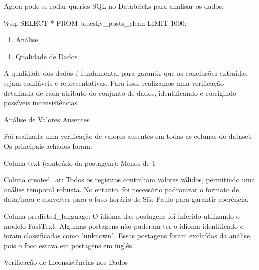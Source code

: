 \documentclass[
  letterpaper,
  DIV=11,
  numbers=noendperiod]{scrartcl}
\newenvironment{Shaded}{\begin{snugshade}}{\end{snugshade}}
\newcommand{\DecValTok}[1]{\textcolor[rgb]{0.68,0.00,0.00}{#1}}
\newcommand{\NormalTok}[1]{\textcolor[rgb]{0.00,0.23,0.31}{#1}}
\newcommand{\OperatorTok}[1]{\textcolor[rgb]{0.37,0.37,0.37}{#1}}
\providecommand{\tightlist}{%
  \setlength{\itemsep}{0pt}\setlength{\parskip}{0pt}}\usepackage{longtable,booktabs,array}
\begin{document}
Agora pode-se rodar queries SQL no Databricks para analisar os dados:

\begin{Shaded}
\begin{Highlighting}[]
\OperatorTok{\%}\NormalTok{sql}
\NormalTok{SELECT }\OperatorTok{*}\NormalTok{ FROM bluesky\_posts\_clean LIMIT }\DecValTok{1000}\OperatorTok{;}
\end{Highlighting}
\end{Shaded}

\begin{enumerate}
\def\labelenumi{\arabic{enumi}.}
\setcounter{enumi}{4}
\tightlist
\item
  Análise
\end{enumerate}

\begin{enumerate}
\def\labelenumi{\alph{enumi}.}
\tightlist
\item
  Qualidade de Dados
\end{enumerate}

A qualidade dos dados é fundamental para garantir que as conclusões
extraídas sejam confiáveis e representativas. Para isso, realizamos uma
verificação detalhada de cada atributo do conjunto de dados,
identificando e corrigindo possíveis inconsistências.

\begin{VerbatimWithBreaks}
Análise de Valores Ausentes 
 
\end{VerbatimWithBreaks}

Foi realizada uma verificação de valores ausentes em todas as colunas do
dataset. Os principais achados foram:

\begin{VerbatimWithBreaks}
Coluna text (conteúdo da postagem):  Menos de 1%

Coluna created_at:  Todos os registros continham valores válidos, permitindo uma análise temporal robusta. No entanto, foi necessário padronizar o formato de data/hora e converter para o fuso horário de São Paulo para garantir coerência. 

Coluna predicted_language:  O idioma das postagens foi inferido utilizando o modelo FastText. Algumas postagens não puderam ter o idioma identificado e foram classificadas como "unknown". Essas postagens foram excluídas da análise, pois o foco estava em postagens em inglês. 
 

Verificação de Inconsistências nos Dados 
 
\end{VerbatimWithBreaks}
\end{document}
